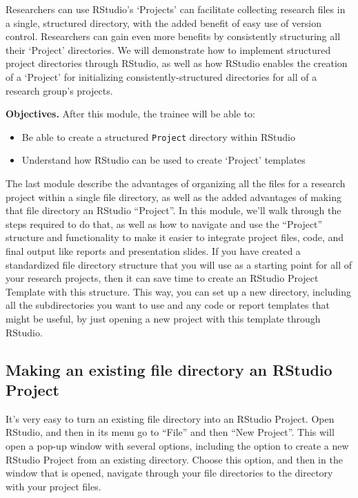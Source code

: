 \documentclass[]{tufte-book}
\providecommand{\tightlist}{%
  \setlength{\itemsep}{0pt}\setlength{\parskip}{0pt}}
\begin{document}
Researchers can use RStudio's `Projects' can facilitate collecting research
files in a single, structured directory, with the added benefit of easy use of
version control. Researchers can gain even more benefits by consistently
structuring all their `Project' directories. We will demonstrate how to
implement structured project directories through RStudio, as well as how RStudio
enables the creation of a `Project' for initializing consistently-structured
directories for all of a research group's projects.

\textbf{Objectives.} After this module, the trainee will be able to:

\begin{itemize}
\tightlist
\item
  Be able to create a structured \texttt{Project} directory within RStudio
\item
  Understand how RStudio can be used to create `Project' templates
\end{itemize}

The last module describe the advantages of organizing all the files for a
research project within a single file directory, as well as the added
advantages of making that file directory an RStudio ``Project''. In this
module, we'll walk through the steps required to do that, as well as
how to navigate and use the ``Project'' structure and functionality to
make it easier to integrate project files, code, and final output like
reports and presentation slides. If you have created a standardized
file directory structure that you will use as a starting point for all of
your research projects, then it can save time to create an RStudio Project
Template with this structure. This way, you can set up a new directory,
including all the subdirectories you want to use and any code or report
templates that might be useful, by just opening a new project with this
template through RStudio.

\hypertarget{making-an-existing-file-directory-an-rstudio-project}{%
\subsection{Making an existing file directory an RStudio Project}\label{making-an-existing-file-directory-an-rstudio-project}}

It's very easy to turn an existing file directory into an RStudio Project.
Open RStudio, and then in its menu go to ``File'' and then ``New Project''.
This will open a pop-up window with several options, including the option to
create a new RStudio Project from an existing directory. Choose this option,
and then in the window that is opened, navigate through your file directories
to the directory with your project files.
\end{document}
